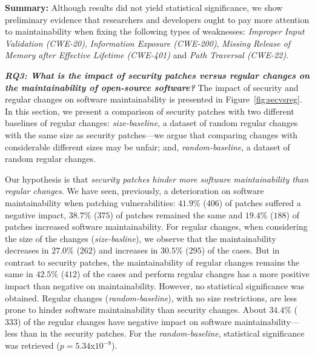 \documentclass[smallextended]{svjour3}       %
\begin{document}
\textbf{Summary:}
Although results did not yield statistical significance, we show preliminary evidence that 
researchers and developers ought to pay more attention to maintainability when fixing the 
following types of weaknesses: \emph{Improper Input Validation (CWE-20)}, \emph{Information Exposure
(CWE-200)}, \emph{Missing Release of Memory after Effective
Lifetime (CWE-401)} and \emph{Path Traversal (CWE-22)}.


\textit{\textbf{RQ3: What is the impact of security patches versus regular 
changes on the maintainability of open-source software?}}
The impact of security and regular changes on software maintainability 
is presented in Figure~\ref{fig:secvsreg}. In this section, 
we present a comparison of security patches with 
two different baselines of regular changes: 
\emph{size-baseline}, a dataset of  
random regular changes with the same size as security 
patches---we argue that comparing changes with considerable different 
sizes may be unfair; and, \emph{random-baseline},
a dataset of random regular changes. 

Our hypothesis is
that \emph{security patches hinder more software maintainability 
than regular changes}. 
We have seen, previously, a deterioration on software maintainability 
when patching vulnerabilities: $41.9\%$ ($406$) of patches suffered a 
negative impact, $38.7\%$ ($375$) of patches remained the same and $19.4\%$ 
($188$) of patches increased software maintainability. For regular changes,
when considering the size of the changes (\emph{size-basline}),
we observe that the maintainability decreases in $27.0\%$ ($262$) 
and increases in $30.5\%$ ($295$) of the cases. But in contrast to 
security patches, the maintainability of regular changes remains the 
same in $42.5\%$ ($412$) of the cases and perform regular
changes has a more positive impact than negative on  
maintainability. However, no statistical significance was 
obtained. Regular changes (\emph{random-baseline}), with no size 
restrictions, are less prone to hinder software maintainability than 
security changes. About $34.4\%$ ($333$) of the regular changes 
have negative impact on software maintainability---less than 
in the security patches. For the \emph{random-baseline}, 
statistical significance was retrieved ($p = 5.34$x$10^{-8}$).
\end{document}
